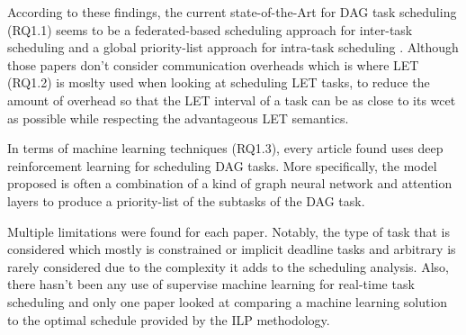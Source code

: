 According to these findings,
the current state-of-the-Art for DAG task scheduling (RQ1.1)
seems to be a federated-based scheduling approach for inter-task 
scheduling and a global priority-list approach for intra-task scheduling
\cite{He2023DegreeOfParallelism}\cite{Zhao2022DAGsched}.
Although those papers don't consider communication overheads
which is where LET (RQ1.2) is moslty used when looking at scheduling 
LET tasks, to reduce the amount of overhead 
so that the LET interval of a task can be as close to 
its wcet as possible while respecting the advantageous LET semantics.

In terms of machine learning techniques (RQ1.3), every article found uses 
deep reinforcement learning for scheduling DAG tasks.
More specifically, the model proposed is often a combination
of a kind of graph neural network and attention layers 
to produce a priority-list of the subtasks of the DAG task.

Multiple limitations were found for each 
paper. Notably, the type of task that is 
considered which mostly is constrained or implicit deadline tasks
and arbitrary is rarely considered due to the complexity it adds
to the scheduling analysis.
Also, there hasn't been any use of supervise machine learning 
for real-time task scheduling
and only one paper looked at comparing a machine learning solution
to the optimal schedule provided by the ILP methodology.